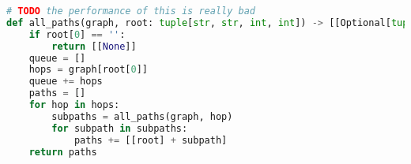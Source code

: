 \begin{lstlisting}[language={Python},caption={DFS-based algorithm which generates a list of all possible paths between between two nodes in a DAG},label={alg:all-paths}]
# TODO the performance of this is really bad
def all_paths(graph, root: tuple[str, str, int, int]) -> [[Optional[tuple[str, str, int, int]]]]:
    if root[0] == '':
        return [[None]]
    queue = []
    hops = graph[root[0]]
    queue += hops
    paths = []
    for hop in hops:
        subpaths = all_paths(graph, hop)
        for subpath in subpaths:
            paths += [[root] + subpath]
    return paths
\end{lstlisting}
